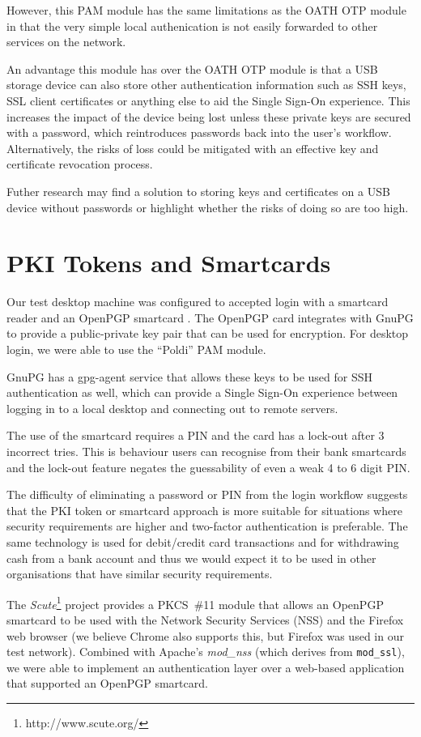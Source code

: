 \documentclass{report}
\begin{document}
However, this PAM module has the same limitations as the
OATH OTP module in that the very simple local authenication
is not easily forwarded to other services on the network.

An advantage this module has over the OATH OTP module is that
a USB storage device can also store other authentication
information such as SSH keys, SSL client certificates or
anything else to aid the Single Sign-On experience. This
increases the impact of the device being lost unless
these private keys are secured with a password, which
reintroduces passwords back into the user's workflow. Alternatively,
the risks of loss could be mitigated with an effective
key and certificate revocation process.

Futher research may find a solution to storing keys
and certificates on a USB device without passwords or highlight
whether the risks of doing so are too high.

\section{PKI Tokens and Smartcards}

Our test desktop machine was configured to accepted login with a smartcard
reader and an OpenPGP smartcard \parencite{pietig2009functional}. The OpenPGP
card integrates with GnuPG to provide a public-private key pair that can
be used for encryption. For desktop login, we were able to use the ``Poldi''
PAM module.

GnuPG has a gpg-agent service that allows these keys to be used for SSH
authentication as well, which can provide a Single Sign-On experience
between logging in to a local desktop and connecting out to remote servers.

The use of the
smartcard requires a PIN and the card has a lock-out after 3 incorrect tries.
This is behaviour users can recognise from their bank smartcards and the
lock-out feature negates the guessability of even a weak 4 to 6 digit PIN.

The difficulty of eliminating a password or PIN from the login workflow
suggests that the PKI token or smartcard approach is more suitable for
situations where security requirements are higher and two-factor authentication
is preferable. The same technology is used for debit/credit card transactions
and for withdrawing cash from a bank account and thus we would expect it
to be used in other organisations that have similar security requirements.

The \emph{Scute}\footnote{http://www.scute.org/}
project provides a PKCS~\#11 module that allows an OpenPGP
smartcard to be used with the Network Security Services (NSS) and
the Firefox web browser (we believe Chrome also supports this, but Firefox
was used in our test network). Combined with Apache's \emph{mod\_nss} (which
derives from \texttt{mod\_ssl}), we were able to implement an authentication layer
over a web-based application that supported an OpenPGP smartcard.
\end{document}
